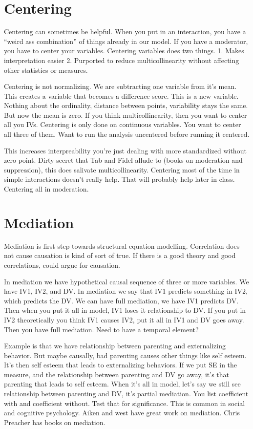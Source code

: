 \documentclass[]{book}
\theoremstyle{definition}
\theoremstyle{definition}
\theoremstyle{definition}
\theoremstyle{remark}
\begin{document}
\section{Centering}\label{centering}

Centering can sometimes be helpful. When you put in an interaction, you
have a ``weird ass combination'' of things already in our model. If you
have a moderator, you have to center your variables. Centering variables
does two things. 1. Makes interpretation easier 2. Purported to reduce
multicollinearity without affecting other statistics or measures.

Centering is not normalizing. We are subtracting one variable from it's
mean. This creates a variable that becomes a difference score. This is a
new variable. Nothing about the ordinality, distance between points,
variability stays the same. But now the mean is zero. If you think
multicollinearity, then you want to center all you IVs. Centering is
only done on continuous variables. You want to center all three of them.
Want to run the analysis uncentered before running it centered.

This increases interpreability you're just dealing with more
standardized without zero point. Dirty secret that Tab and Fidel allude
to (books on moderation and suppression), this does salivate
multicollinearity. Centering most of the time in simple interactions
doesn't really help. That will probably help later in class. Centering
all in moderation.

\section{Mediation}\label{mediation}

Mediation is first step towards structural equation modelling.
Correlation does not cause causation is kind of sort of true. If there
is a good theory and good correlations, could argue for causation.

In mediation we have hypothetical causal sequence of three or more
variables. We have IV1, IV2, and DV. In mediation we say that IV1
predicts something in IV2, which predicts the DV. We can have full
mediation, we have IV1 predicts DV. Then when you put it all in model,
IV1 loses it relationship to DV. If you put in IV2 theoretically you
think IV1 causes IV2, put it all in IV1 and DV goes away. Then you have
full mediation. Need to have a temporal element?

Example is that we have relationship between parenting and externalizing
behavior. But maybe causally, bad parenting causes other things like
self esteem. It's then self esteem that leads to externalizing
behaviors. If we put SE in the measure, and the relationship between
parenting and DV go away, it's that parenting that leads to self esteem.
When it's all in model, let's say we still see relationship between
parenting and DV, it's partial mediation. You list coefficient with and
coefficient without. Test that for significance. This is common in
social and cognitive psychology. Aiken and west have great work on
mediation. Chris Preacher has books on mediation.
\end{document}
